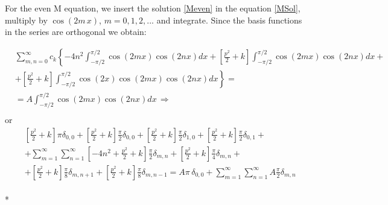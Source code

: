 For the even M equation, we insert the solution \eqref{Meven} in the equation \eqref{MSol}, multiply by $ \cos(2m\,x) $, $ m = 0,1,2,... $ and integrate. Since the basis functions in the series are orthogonal we obtain:

\begin{equation}
\begin{split}
& \sum_{m,n=0}^{\infty}c_k \left\{-4n^2\int_{-\pi/2}^{\pi/2}{\cos(2 mx)\cos(2 nx)dx} + \left[ \frac{p^2}{2} +k \right]\int_{-\pi/2}^{\pi/2}{\cos(2 mx)\cos(2 nx)dx} + \right. \\[.8em]
& \left. + \left[ \frac{p^2}{2} + k\right] \int_{-\pi/2}^{\pi/2}{\cos(2 x)\cos(2 mx)\cos(2 nx)dx} \right\} = \\[.8em]
& = A \int_{-\pi/2}^{\pi/2}{\cos(2 mx)\cos(2 nx)dx}  \,\Longrightarrow\\[.8em]
\end{split}
\end{equation}
or
\begin{equation}
\begin{split}
& \left[ \frac{p^2}{2} +k\right]\pi\delta_{0,0} + \left[ \frac{p^2}{2} +k\right]\frac{\pi}{2}\delta_{0,0}+ \left[ \frac{p^2}{2} +k\right]\frac{\pi}{2}\delta_{1,0}+ \left[ \frac{p^2}{2} +k\right]\frac{\pi}{2}\delta_{0,1} + \\[.8em] 
& + \sum_{m=1}^{\infty}\sum_{n=1}^{\infty} {\left[-4n^2 +\frac{p^2}{2} + k\right]\frac{\pi}{2} \delta_{m,n} + \left[\frac{p^2}{2} + k\right]\frac{\pi}{4} \delta_{m,n} } + \\[.8em]
& + \left[\frac{p^2}{2}+k\right]\frac{\pi}{8}\delta_{m,n+1} + \left[\frac{p^2}{2}+k\right]\frac{\pi}{8}\delta_{m,n-1}  = A \pi\,\delta_{0,0} + \sum_{m=1}^{\infty}\sum_{n=1}^{\infty}{A\frac{\pi}{2}\delta_{m,n}}
\end{split}
\end{equation}\\*

